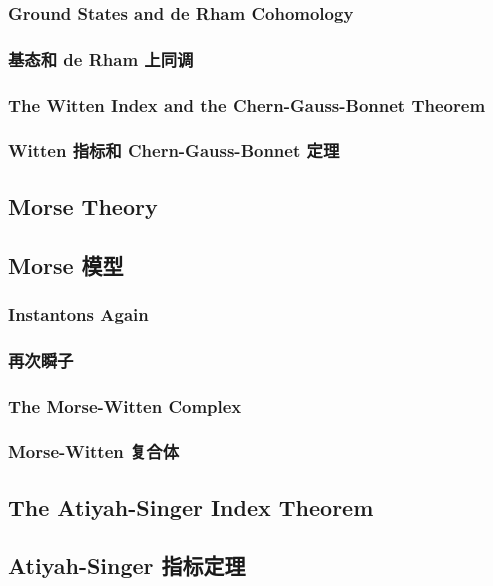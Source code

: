 \documentclass{article}
\begin{document}
\begin{paracol}{2}
\subsubsection{Ground States and de Rham Cohomology}
\switchcolumn
\subsubsection*{基态和 de Rham 上同调}
\switchcolumn*

\subsubsection{The Witten Index and the Chern-Gauss-Bonnet Theorem}
\switchcolumn
\subsubsection*{Witten 指标和 Chern-Gauss-Bonnet 定理}
\switchcolumn*

\subsection{Morse Theory}
\switchcolumn
\subsection*{Morse 模型}
\switchcolumn*

\subsubsection{Instantons Again}
\switchcolumn
\subsubsection*{再次瞬子}
\switchcolumn*

\subsubsection{The Morse-Witten Complex}
\switchcolumn
\subsubsection*{Morse-Witten 复合体}
\switchcolumn*

\subsection{The Atiyah-Singer Index Theorem}
\switchcolumn
\subsection*{Atiyah-Singer 指标定理}
\switchcolumn*


\end{paracol}
\end{document}
